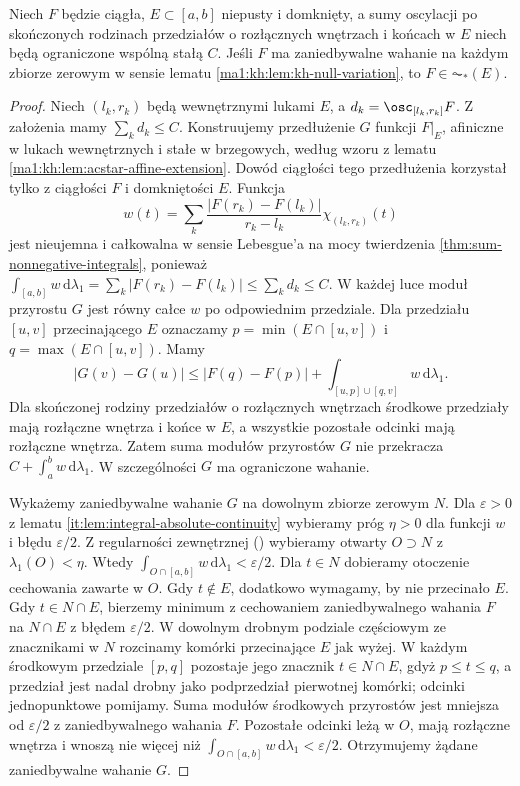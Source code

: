 \begin{lemat}
\label{ma1:kh:lem:bvstar-null-to-acstar}\label{it:lem:bvstar-null-to-acstar}
Niech $F$ będzie ciągła, $E\subset[a,b]$ niepusty i domknięty, a sumy oscylacji po skończonych rodzinach przedziałów o rozłącznych wnętrzach i końcach w $E$ niech będą ograniczone wspólną stałą $C$. Jeśli $F$ ma zaniedbywalne wahanie na każdym zbiorze zerowym w sensie lematu \ref{ma1:kh:lem:kh-null-variation}, to $F\in\AC_*(E)$.
\end{lemat}
\begin{proof}
Niech $(l_k,r_k)$ będą wewnętrznymi lukami $E$, a $d_k=\osc_{[l_k,r_k]}F$. Z założenia mamy $\sum_k d_k\le C$. Konstruujemy przedłużenie $G$ funkcji $F|_E$, afiniczne w lukach wewnętrznych i stałe w brzegowych, według wzoru z lematu \ref{ma1:kh:lem:acstar-affine-extension}. Dowód ciągłości tego przedłużenia korzystał tylko z ciągłości $F$ i domkniętości $E$. Funkcja
\[
 w(t)=\sum_k\frac{|F(r_k)-F(l_k)|}{r_k-l_k}\chi_{(l_k,r_k)}(t)
\]
jest nieujemna i całkowalna w sensie Lebesgue'a na mocy twierdzenia \ref{thm:sum-nonnegative-integrals}, ponieważ $\int_{[a,b]}w\,\mathrm d\lambda_1=\sum_k|F(r_k)-F(l_k)|\le\sum_k d_k\le C$. W każdej luce moduł przyrostu $G$ jest równy całce $w$ po odpowiednim przedziale. Dla przedziału $[u,v]$ przecinającego $E$ oznaczamy $p=\min(E\cap[u,v])$ i $q=\max(E\cap[u,v])$. Mamy
\[
 |G(v)-G(u)|\le |F(q)-F(p)|
 +\int_{[u,p]\cup[q,v]}w\,\mathrm d\lambda_1.
\]
Dla skończonej rodziny przedziałów o rozłącznych wnętrzach środkowe przedziały mają rozłączne wnętrza i końce w $E$, a wszystkie pozostałe odcinki mają rozłączne wnętrza. Zatem suma modułów przyrostów $G$ nie przekracza $C+\int_a^b w\,\mathrm d\lambda_1$. W szczególności $G$ ma ograniczone wahanie.

Wykażemy zaniedbywalne wahanie $G$ na dowolnym zbiorze zerowym $N$. Dla $\varepsilon>0$ z lematu \ref{it:lem:integral-absolute-continuity} wybieramy próg $\eta>0$ dla funkcji $w$ i błędu $\varepsilon/2$. Z regularności zewnętrznej () wybieramy otwarty $O\supset N$ z $\lambda_1(O)<\eta$. Wtedy $\int_{O\cap[a,b]}w\,\mathrm d\lambda_1<\varepsilon/2$. Dla $t\in N$ dobieramy otoczenie cechowania zawarte w $O$. Gdy $t\notin E$, dodatkowo wymagamy, by nie przecinało $E$. Gdy $t\in N\cap E$, bierzemy minimum z cechowaniem zaniedbywalnego wahania $F$ na $N\cap E$ z błędem $\varepsilon/2$. W dowolnym drobnym podziale częściowym ze znacznikami w $N$ rozcinamy komórki przecinające $E$ jak wyżej. W każdym środkowym przedziale $[p,q]$ pozostaje jego znacznik $t\in N\cap E$, gdyż $p\le t\le q$, a przedział jest nadal drobny jako podprzedział pierwotnej komórki; odcinki jednopunktowe pomijamy. Suma modułów środkowych przyrostów jest mniejsza od $\varepsilon/2$ z zaniedbywalnego wahania $F$. Pozostałe odcinki leżą w $O$, mają rozłączne wnętrza i wnoszą nie więcej niż $\int_{O\cap[a,b]}w\,\mathrm d\lambda_1<\varepsilon/2$. Otrzymujemy żądane zaniedbywalne wahanie $G$.


\end{proof}
